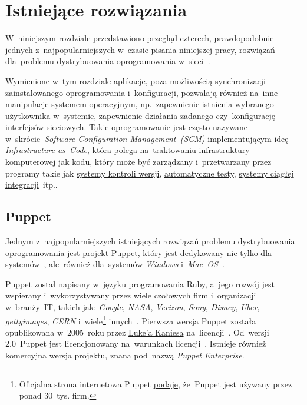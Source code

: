 \documentclass[thesis]{subfiles}
\begin{document}

\chapter{Istniejące rozwiązania}
\label{ch:istniejace-rozwiazania}

W~niniejszym rozdziale przedstawiono przegląd czterech, prawdopodobnie jednych z~najpopularniejszych w~czasie pisania niniejszej pracy, rozwiązań dla~problemu dystrybuowania oprogramowania w~sieci~\cite{leading-scms,wiki:scm-comparison}.

Wymienione w~tym rozdziale aplikacje, poza możliwością synchronizacji zainstalowanego oprogramowania i~konfiguracji, pozwalają również na~inne manipulacje systemem operacyjnym, np.~zapewnienie istnienia wybranego użytkownika w~systemie, zapewnienie działania zadanego  czy~konfigurację interfejsów sieciowych. Takie oprogramowanie jest często nazywane w~skrócie~\emph{Software Configuration Management~(SCM)} implementującym ideę \emph{Infrastructure as~Code}, która polega na~traktowaniu infrastruktury komputerowej jak kodu, który może być zarządzany i~przetwarzany przez programy takie jak \href{https://en.wikipedia.org/wiki/Version_control}{systemy kontroli wersji}, \href{https://en.wikipedia.org/wiki/Test_automation}{automatyczne testy}, \href{https://en.wikipedia.org/wiki/Comparison_of_continuous_integration_software}{systemy ciągłej integracji}~itp.\cite{puppet-iac,wiki:iac,wiki:scm}.


\section{Puppet}
\label{sec:puppet}

Jednym z~najpopularniejszych istniejących rozwiązań problemu dystrybuowania oprogramowania jest projekt Puppet, który jest dedykowany nie tylko dla systemów~, ale~również dla~systemów \emph{Windows} i~\emph{Mac~OS}~\cite{puppet,puppet-github,puppet-clients}.

Puppet został napisany w~języku programowania \href{https://en.wikipedia.org/wiki/Ruby_(programming_language)}{Ruby}, a~jego rozwój jest wspierany i~wykorzystywany przez wiele czołowych firm i~organizacji w~branży~IT, takich jak: \emph{Google}, \emph{NASA}, \emph{Verizon}, \emph{Sony}, \emph{Disney}, \emph{Uber}, \emph{gettyimages}, \emph{CERN} i~wiele\footnote{Oficjalna strona internetowa Puppet \href{https://puppet.com/company/leadership/luke-kanies}{podaje}, że~Puppet jest używany przez ponad 30~tys. firm.} innych~\cite{puppet,puppet-google,puppet-cern,puppet-chef-disney}. Pierwsza wersja Puppet została opublikowana w~2005~roku przez \href{https://puppet.com/company/leadership/luke-kanies}{Luke'a Kaniesa} na~licencji~. Od~wersji 2.0~Puppet jest licencjonowany na~warunkach licencji~. Istnieje również komercyjna wersja projektu, znana pod~nazwą \emph{Puppet Enterprise}.
\end{document}
